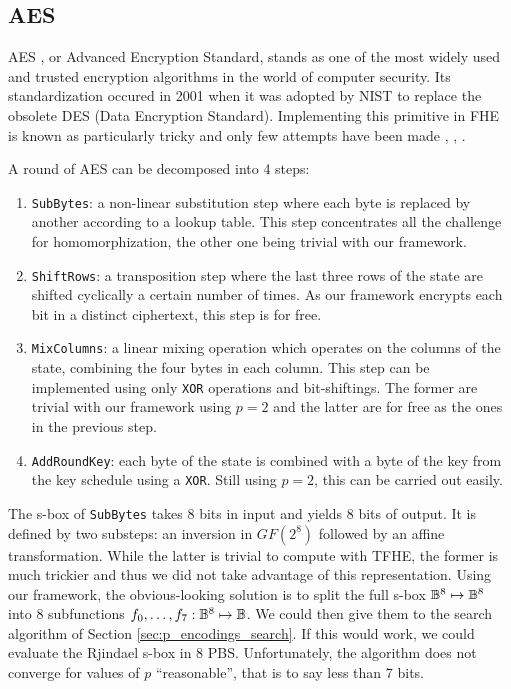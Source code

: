 \subsection{AES}
\label{sec:p_encodings_aes}


AES \cite{aes-original}, or Advanced Encryption Standard, stands as one of the most widely used and trusted encryption algorithms in the world of computer security. Its standardization occured in 2001 when it was adopted by NIST to replace the obsolete DES (Data Encryption Standard). Implementing this primitive in FHE is known as particularly tricky and only few attempts have been made \cite{C:GenHalSma12}, \cite{PKC:CorLepTib14}, \cite{DBLP:conf/wahc/TramaCBS23}.

A round of AES can be decomposed into 4 steps:
\begin{enumerate}
    \item \texttt{SubBytes}: a non-linear substitution step where each byte is replaced by another according to a lookup table. This step concentrates all the challenge for homomorphization, the other one being trivial with our framework.
    \item \texttt{ShiftRows}: a transposition step where the last three rows of the state are shifted cyclically a certain number of times. As our framework encrypts each bit in a distinct ciphertext, this step is for free.
    \item \texttt{MixColumns}: a linear mixing operation which operates on the columns of the state, combining the four bytes in each column. This step can be implemented using only \texttt{XOR} operations and bit-shiftings. The former are trivial with our framework using $p=2$ and the latter are for free as the ones in the previous step.
    \item \texttt{AddRoundKey}: each byte of the state is combined with a byte of the key from the key schedule using a \texttt{XOR}. Still using $p=2$, this can be carried out easily. 
\end{enumerate}


 The s-box of \texttt{SubBytes} takes 8 bits in input and yields 8 bits of output. It is defined by two substeps: an inversion in $GF(2^8)$ followed by an affine transformation. While the latter is trivial to compute with TFHE, the former is much trickier and thus we did not take advantage of this representation. Using our framework, the obvious-looking solution is to split the full s-box $\mathbb{B}^8 \mapsto \mathbb{B}^8$ into 8 subfunctions $f_0, \dots, f_7: \mathbb{B}^8 \mapsto \mathbb{B}$. We could then give them to the search algorithm of Section \ref{sec:p_encodings_search}. If this would work, we could evaluate the Rjindael s-box in 8 PBS. Unfortunately, the algorithm does not converge for values of $p$ ``reasonable'', that is to say less than 7 bits. 


